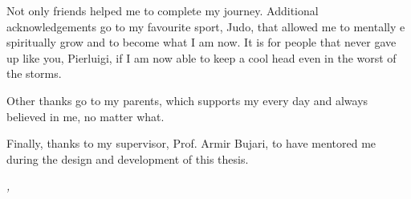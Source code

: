 \vspace{0.3cm}

\noindent Not only friends helped me to complete my journey. Additional
acknowledgements go to my favourite sport, Judo, that allowed me to mentally e
spiritually grow and to become what I am now. It is for people that never gave
up like you, Pierluigi, if I am now able to keep a cool head even in the worst
of the storms.

\vspace{0.3cm}

\noindent Other thanks go to my parents, which supports my every day and always
believed in me, no matter what.

\vspace{0.3cm}

\noindent Finally, thanks to my supervisor, Prof. Armir Bujari, to have
mentored me during the design and development of this thesis.

\vspace{0.5cm}





\noindent\textit{\myLocation, \myTime}
\hfill \myName

\endgroup
